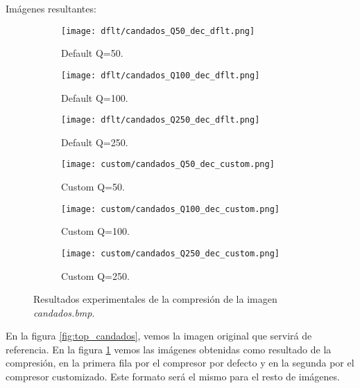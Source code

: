 \documentclass[12pt,a4paper]{article}
\begin{document}
Imágenes resultantes:
\begin{figure}   [H]
    \begin{subfigure}{0.20\textwidth}
        \centering
        \texttt{[image: dflt/candados\_Q50\_dec\_dflt.png]}
        \caption{Default Q=50.}
        
    \end{subfigure}
    \hfill
    \begin{subfigure}{0.20\textwidth}
        \centering
        \texttt{[image: dflt/candados\_Q100\_dec\_dflt.png]}
        \caption{Default Q=100.}
        
    \end{subfigure}
    \hfill
    \begin{subfigure}{0.20\textwidth}
        \centering
        \texttt{[image: dflt/candados\_Q250\_dec\_dflt.png]}
        \caption{Default Q=250.}
        
    \end{subfigure}
    
    \vspace{0.5cm}
    
    \begin{subfigure}{0.20\textwidth}
        \centering
        \texttt{[image: custom/candados\_Q50\_dec\_custom.png]}
        \caption{Custom Q=50.}
        
    \end{subfigure}
    \hfill
    \begin{subfigure}{0.20\textwidth}
        \centering
        \texttt{[image: custom/candados\_Q100\_dec\_custom.png]}
        \caption{Custom Q=100.}
        
    \end{subfigure}
    \hfill
    \begin{subfigure}{0.20\textwidth}
        \centering
        \texttt{[image: custom/candados\_Q250\_dec\_custom.png]}
        \caption{Custom Q=250.}
        
    \end{subfigure}
    
    \caption[Resultados experimentales - candado]{Resultados experimentales de la compresión de la imagen \textit{candados.bmp}.}
    \label{fig:candados_cuali}
\end{figure}

En la figura \ref{fig:top_candados}, vemos la imagen original que servirá de referencia. En la figura \ref{fig:candados_cuali} vemos las imágenes obtenidas como resultado de la compresión, en la primera fila por el compresor por defecto y en la segunda por el compresor customizado. Este formato será el mismo para el resto de imágenes.\\
\end{document}
